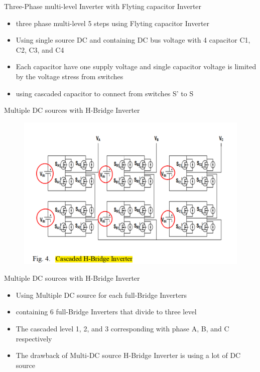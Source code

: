 \documentclass[
	11pt, %
]{beamer}
\begin{document}
\begin{frame}{Three-Phase multi-level Inverter with Flyting capacitor Inverter}
	\begin{itemize}
		\setlength{\itemsep}{10pt}
		\item {three phase multi-level 5 steps using Flyting capacitor Inverter}
		\item {Using single source DC and containing DC bus voltage with 4 capacitor C1, C2, C3, and C4}
		\item {Each capacitor have one supply voltage and single capacitor voltage is limited by the voltage stress from switches}
		\item {using cascaded capacitor to connect from switches S' to S}
	\end{itemize}
\end{frame}

\begin{frame}{Multiple DC sources with H-Bridge Inverter}
	\begin{figure}
		\includegraphics[width=0.7\linewidth]{cascade_Hbridge.png}
	\end{figure}
\end{frame}

\begin{frame}{Multiple DC sources with H-Bridge Inverter}
	\begin{itemize}
		\setlength{\itemsep}{10pt}
		\item {Using Multiple DC source for each full-Bridge Inverters}
		\item {containing 6 full-Bridge Inverters that divide to three level}
		\item {The cascaded level 1, 2, and 3 corresponding with phase A, B, and C respectively}
		\item {The drawback of Multi-DC source H-Bridge Inverter is using a lot of DC source}
	\end{itemize}
\end{frame}
\end{document}
